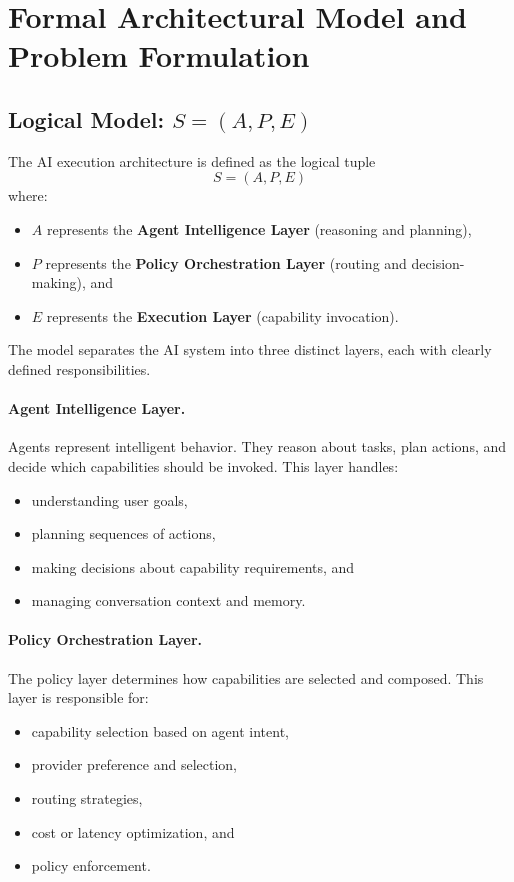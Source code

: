 \section{Formal Architectural Model and Problem Formulation}

\subsection{Logical Model: \texorpdfstring{$S = (A, P, E)$}{S = (A, P, E)}}

The AI execution architecture is defined as the logical tuple
\begin{equation}
S = (A, P, E)
\label{eq:logical-model}
\end{equation}
where:
\begin{itemize}[leftmargin=*,nosep]
  \item $A$ represents the \textbf{Agent Intelligence Layer} (reasoning and planning),
  \item $P$ represents the \textbf{Policy Orchestration Layer} (routing and decision-making), and
  \item $E$ represents the \textbf{Execution Layer} (capability invocation).
\end{itemize}

The model separates the AI system into three distinct layers, each with clearly defined responsibilities.

\paragraph{Agent Intelligence Layer.}
Agents represent intelligent behavior. They reason about tasks, plan actions, and decide which capabilities should be invoked. This layer handles:
\begin{itemize}[leftmargin=*,nosep]
  \item understanding user goals,
  \item planning sequences of actions,
  \item making decisions about capability requirements, and
  \item managing conversation context and memory.
\end{itemize}

\paragraph{Policy Orchestration Layer.}
The policy layer determines how capabilities are selected and composed. This layer is responsible for:
\begin{itemize}[leftmargin=*,nosep]
  \item capability selection based on agent intent,
  \item provider preference and selection,
  \item routing strategies,
  \item cost or latency optimization, and
  \item policy enforcement.
\end{itemize}

